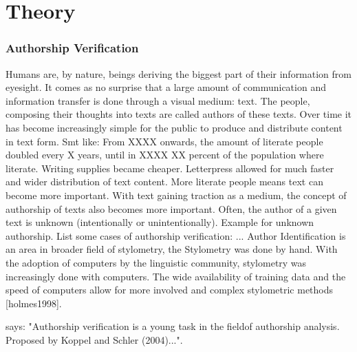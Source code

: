\chapter{Theory}\label{theory}
\subsection{Authorship Verification}
Humans are, by nature, beings deriving the biggest part of their information from eyesight.
It comes as no surprise that a large amount of communication and information transfer is done through a visual medium: text.
The people, composing their thoughts into texts are called authors of these texts.
Over time it has become increasingly simple for the public to produce and distribute content in text form.
Smt like: From XXXX onwards, the amount of literate people doubled every X years, until in XXXX XX percent of the population where literate.
Writing supplies became cheaper.
Letterpress allowed for much faster and wider distribution of text content.
More literate people means text can become more important.
With text gaining traction as a medium, the concept of authorship of texts also becomes more important.
Often, the author of a given text is unknown (intentionally or unintentionally).
Example for unknown authorship.
List some cases of authorship verification: ... %
Author Identification is an area in broader field of stylometry, the
Stylometry was done by hand.
With the adoption of computers by the linguistic community, stylometry was increasingly done with computers.
The wide availability of training data and the speed of computers allow for more involved and complex stylometric methods [holmes1998].

\cite{stein2019unbiasedGutenbergCorpus} says: "Authorship verification is a young task in the fieldof authorship analysis.
 Proposed by Koppel and Schler (2004)...".


